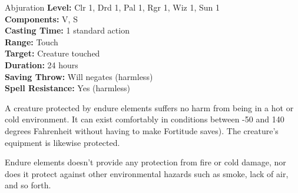 {Abjuration}
{
	\textbf{Level:}
	Clr 1, Drd 1, Pal 1, Rgr 1, Wiz 1, Sun 1\\
	\textbf{Components:}
	V, S\\
	\textbf{Casting Time:}
	1 standard action\\
	\textbf{Range:}
	Touch\\
	\textbf{Target:}
	Creature touched\\
	\textbf{Duration:}
	24 hours\\
	\textbf{Saving Throw:}
	Will negates (harmless)\\
	\textbf{Spell Resistance:}
	Yes (harmless)\\
}
{
	A creature protected by endure elements suffers no harm from being in a hot or cold environment. It can exist comfortably in conditions between -50 and 140 degrees Fahrenheit without having to make Fortitude saves). The creature's equipment is likewise protected.

	Endure elements doesn't provide any protection from fire or cold damage, nor does it protect against other environmental hazards such as smoke, lack of air, and so forth.

}
